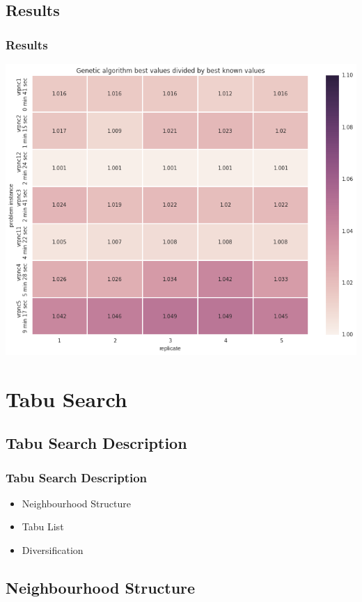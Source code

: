 \documentclass{beamer}
\begin{document}
\subsection{Results}
\begin{frame}
\frametitle{Results}
\begin{center}
\includegraphics[scale=0.25]{figs/ga_best}

\end{center}
\end{frame}

\section{Tabu Search}

\subsection{Tabu Search Description}

\begin{frame}
\frametitle{Tabu Search Description}
\begin{itemize}
	\item Neighbourhood Structure
	\item Tabu List
	\item Diversification
\end{itemize}
\end{frame}


\subsection{Neighbourhood Structure}
\end{document}
